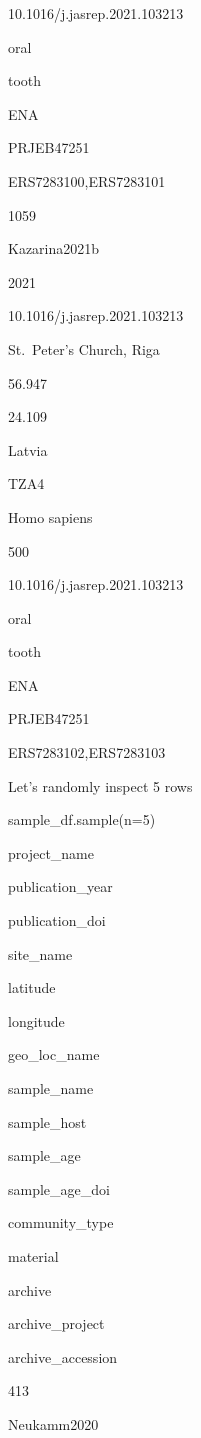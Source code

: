 \documentclass[
  letterpaper,
]{book}
\newenvironment{Shaded}{}{}
\newcommand{\DecValTok}[1]{\textcolor[rgb]{0.00,0.36,0.77}{#1}}
\newcommand{\NormalTok}[1]{\textcolor[rgb]{0.14,0.16,0.18}{#1}}
\newcommand{\OperatorTok}[1]{\textcolor[rgb]{0.14,0.16,0.18}{#1}}
\begin{document}
10.1016/j.jasrep.2021.103213

oral

tooth

ENA

PRJEB47251

ERS7283100,ERS7283101

1059

Kazarina2021b

2021

10.1016/j.jasrep.2021.103213

St.~Peter's Church, Riga

56.947

24.109

Latvia

TZA4

Homo sapiens

500

10.1016/j.jasrep.2021.103213

oral

tooth

ENA

PRJEB47251

ERS7283102,ERS7283103

Let's randomly inspect 5 rows

\begin{Shaded}
\begin{Highlighting}[]
\NormalTok{sample\_df.sample(n}\OperatorTok{=}\DecValTok{5}\NormalTok{)}
\end{Highlighting}
\end{Shaded}

project\_name

publication\_year

publication\_doi

site\_name

latitude

longitude

geo\_loc\_name

sample\_name

sample\_host

sample\_age

sample\_age\_doi

community\_type

material

archive

archive\_project

archive\_accession

413

Neukamm2020
\end{document}
